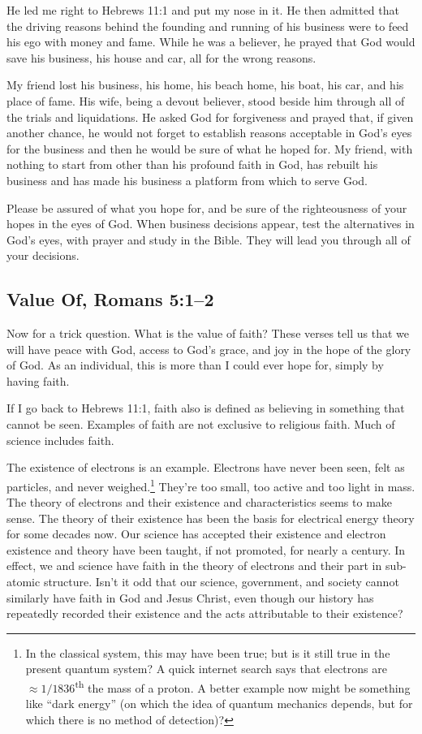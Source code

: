 \documentclass[12pt]{memoir}
\begin{document}
He led me right to Hebrews 11:1 and put my nose in it. He then admitted that the driving reasons behind the founding and running of his business were to feed his ego with money and fame. While he was a believer, he prayed that God would save his business, his house and car, all for the wrong reasons.

My friend lost his business, his home, his beach home, his boat, his
car, and his place of fame. His wife, being a devout believer,
stood beside him through all of the trials and liquidations.
He asked God for forgiveness and prayed that, if given another chance,
he would not forget to establish reasons acceptable in God's eyes
for the business and then he would be sure of what he hoped for.
My friend, with nothing to start from other than his profound faith
in God, has rebuilt his business and has made his business a platform
from which to serve God.

Please be assured of what you hope for, and be sure of the righteousness
of your hopes in the eyes of God. When business decisions appear,
test the alternatives in God's eyes, with prayer and study in the
Bible. They will lead you through all of your decisions.

\subsection[Value Of]{Value Of, Romans 5:1--2}

Now for a trick question. What is the value of faith? These verses
tell us that we will have peace with God, access to God's grace, and
joy in the hope of the glory of God. As an individual, this is more
than I could ever hope for, simply by having faith.

If I go back to Hebrews 11:1, faith also is defined as believing in
something that cannot be seen. Examples of faith are not exclusive
to religious faith. Much of science includes faith.

The existence
of electrons is an example. Electrons have never been seen, felt as particles, and never weighed.\footnote{In the classical system, this may have been true; but is it still true in the present quantum system? A quick internet search says that electrons are $\approx 1/1836$\textsuperscript{th} the mass of a proton. A better example now might be something like ``dark energy'' (on which the idea of quantum mechanics depends, but for which there is no method of detection)?} They're too small, too active and too light in mass. The theory of electrons and their existence and characteristics seems to make sense. The theory of their existence has been the basis for electrical energy theory for some decades now. Our science has accepted their existence and electron existence and theory have been taught, if not promoted, for nearly a century. In effect, we and science have faith in the theory of electrons and their part in sub-atomic structure.
Isn't it odd that our science, government, and society cannot similarly have faith in God and Jesus Christ, even though our history has repeatedly recorded their existence and the acts attributable to their existence?
\end{document}
